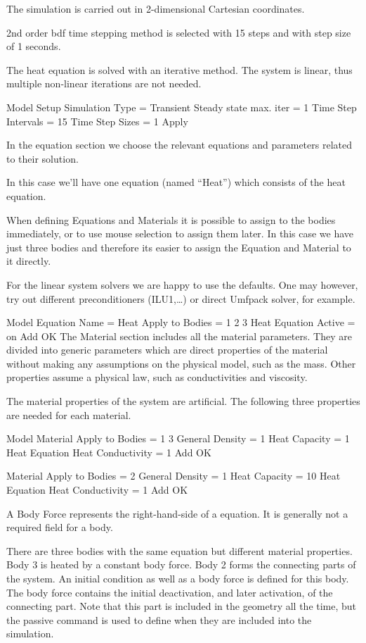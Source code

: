 The simulation is carried out in 2-dimensional Cartesian coordinates.

2nd order bdf time stepping method is selected with 15 steps and with step size of 1 seconds.

The heat equation is solved with an iterative method. The system is linear, thus multiple non-linear iterations are not needed.

\ttbegin
Model
  Setup 
    Simulation Type = Transient
    Steady state max. iter = 1
    Time Step Intervals = 15
    Time Step Sizes = 1
  Apply
\ttend

In the equation section we choose the relevant equations and parameters related to their solution. 

In this case we'll have one equation (named ``Heat'') which consists of the heat equation.

When defining Equations and Materials it is possible to assign to the bodies immediately, or to use mouse selection to assign them later. In this case we have just three bodies and therefore its easier to assign the Equation and Material to it directly. 

For the linear system solvers we are happy to use the defaults. One may however, try out different preconditioners (ILU1,\ldots) or direct Umfpack solver, for example.

\ttbegin
Model
  Equation
   Name = Heat
    Apply to Bodies = 1 2 3
    Heat Equation
      Active = on
    Add 
    OK
\ttend        
The Material section includes all the material parameters. They are divided into generic parameters which are direct properties of the material without making any assumptions on the physical model, such as the mass. Other properties assume a physical law, such as conductivities and viscosity. 

The material properties of the system are artificial. The following three properties are needed for each material.

\ttbegin
Model
  Material
    Apply to Bodies = 1 3 
    General 
      Density = 1
      Heat Capacity = 1
    Heat Equation
      Heat Conductivity = 1
    Add
    OK

  Material
    Apply to Bodies = 2
    General 
      Density = 1
      Heat Capacity = 10
    Heat Equation
      Heat Conductivity = 1
    Add
    OK
\ttend

A Body Force represents the right-hand-side of a equation. It is generally not a required field for a body. 

There are three bodies with the same equation but different material properties. Body 3 is heated by a constant body force. Body 2 forms the connecting parts of the system. An initial condition as well as a body force is defined for this body. The body force contains the initial deactivation, and later activation, of the connecting part. Note that this part is included in the geometry all the time, but the passive command is used to define when they are included into the simulation.

